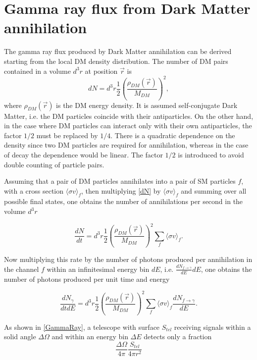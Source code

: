 \appendix


\chapter{Gamma ray flux from Dark Matter annihilation} \label{app:gammaflux}

The gamma ray flux produced by Dark Matter annihilation can be derived starting from the local DM density distribution.
The number of DM pairs contained in a volume $d^3r$ at position $\vec{r}$ is
\begin{equation} \label{dN}
    dN = d^3r \frac{1}{2} \left( \frac{\rho_{DM}(\vec{r})}{M_{DM}} \right)^2,
\end{equation}
where $\rho_{DM}(\vec{r})$ is the DM energy density. It is assumed self-conjugate Dark Matter, i.e. the DM particles coincide with their antiparticles. On the other hand, in the case where DM particles can interact only with their own antiparticles, the factor $1/2$ must be replaced by $1/4$.
There is a quadratic dependence on the density since two DM particles are required for annihilation, whereas in the case of decay the dependence would be linear. 
The factor $1/2$ is introduced to avoid double counting of particle pairs.

Assuming that a pair of DM particles annihilates into a pair of SM particles $f$, with a cross section $\langle \sigma v \rangle_f$, then multiplying \cref{dN} by $\langle \sigma v \rangle_f$ and summing over all possible final states, one obtains the number of annihilations per second in the volume $d^3r$

\begin{equation}
   \frac{dN}{dt} = d^3r \frac{1}{2} \left( \frac{\rho_{DM}(\vec{r})}{M_{DM}} \right)^2 \sum_f \langle \sigma v \rangle_f.
\end{equation}

Now multiplying this rate by the number of photons produced per annihilation in the channel $f$ within an infinitesimal energy bin $dE$, i.e. $\frac{dN_{f\to\gamma}}{dE}dE$, one obtains the number of photons produced per unit time and energy

\begin{equation}
   \frac{dN_{\gamma}}{dtdE} = d^3r \frac{1}{2} \left( \frac{\rho_{DM}(\vec{r})}{M_{DM}} \right)^2 \sum_f \langle \sigma v \rangle_f \frac{dN_{f\to\gamma}}{dE}. 
\end{equation}

As shown in \cref{GammaRay}, a telescope with surface $S_{tel}$ receiving signals within a solid angle $\Delta\Omega$ and within an energy bin $\Delta E$ detects only a fraction 
\begin{equation}
\frac{\Delta\Omega}{4\pi} \frac{S_{tel}}{4\pi r^2}
\end{equation}


